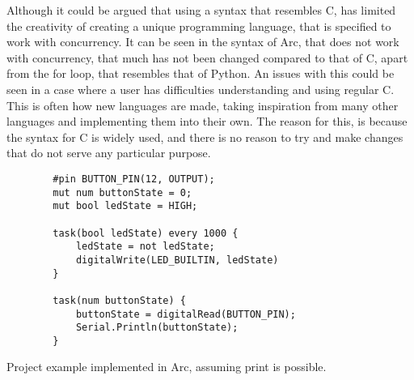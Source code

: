 Although it could be argued that using a syntax that resembles C, has limited the creativity of creating a unique programming language, that is specified to work with concurrency. It can be seen in the syntax of Arc, that does not work with concurrency, that much has not been changed compared to that of C, apart from the for loop, that resembles that of Python. An issues with this could be seen in a case where a user has difficulties understanding and using regular C. This is often how new languages are made, taking inspiration from many other languages and implementing them into their own. The reason for this, is because the syntax for C is widely used, and there is no reason to try and make changes that do not serve any particular purpose. 


\begin{listing}[htb!]
    \begin{verbatim}
        #pin BUTTON_PIN(12, OUTPUT);
        mut num buttonState = 0;
        mut bool ledState = HIGH;

        task(bool ledState) every 1000 {
            ledState = not ledState;
            digitalWrite(LED_BUILTIN, ledState)
        }

        task(num buttonState) {
            buttonState = digitalRead(BUTTON_PIN);
            Serial.Println(buttonState);
        }
    \end{verbatim}
    \caption{Project example implemented in Arc, assuming print is possible.}
    \label{lst:arcexample}
\end{listing}